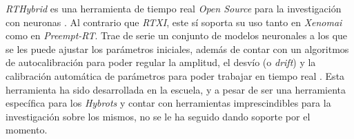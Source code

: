 
\textit{RTHybrid} es una herramienta de tiempo real \textit{Open Source} para la investigación con neuronas \cite{Amaducci2019}. Al contrario que \textit{RTXI}, este sí soporta su uso tanto en \textit{Xenomai} como en \textit{Preempt-RT}. Trae de serie un conjunto de modelos neuronales a los que se les puede ajustar los parámetros iniciales, además de contar con un algoritmos de autocalibración para poder regular la amplitud, el desvío (o \textit{drift}) y la calibración automática de parámetros para poder trabajar en tiempo real \cite{ReyesSnchez2023}. Esta herramienta ha sido desarrollada en la escuela, y a pesar de ser una herramienta específica para los \textit{Hybrots} y contar con herramientas imprescindibles para la investigación sobre los mismos, no se le ha seguido dando soporte por el momento.
